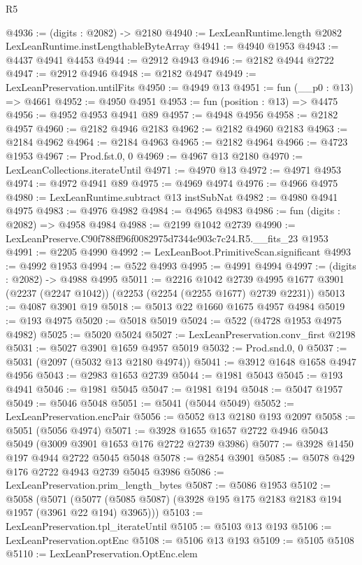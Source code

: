 \begin{lexlean}{R5}
\begin{coremodule}
@4936 := (digits : @2082) -> @2180
@4940 := LexLeanRuntime.length @2082 LexLeanRuntime.instLengthableByteArray
@4941 := @4940 @1953
@4943 := @4437 @4941 @4453
@4944 := @2912 @4943
@4946 := @2182 @4944 @2722
@4947 := @2912 @4946
@4948 := @2182 @4947
@4949 := LexLeanPreservation.untilFits
@4950 := @4949 @13
@4951 := fun (__p0 : @13) => @4661
@4952 := @4950 @4951
@4953 := fun (position : @13) => @4475
@4956 := @4952 @4953 @4941 @89
@4957 := @4948 @4956
@4958 := @2182 @4957
@4960 := @2182 @4946 @2183
@4962 := @2182 @4960 @2183
@4963 := @2184 @4962
@4964 := @2184 @4963
@4965 := @2182 @4964
@4966 := @4723 @1953
@4967 := Prod.fst.{0, 0}
@4969 := @4967 @13 @2180
@4970 := LexLeanCollections.iterateUntil
@4971 := @4970 @13
@4972 := @4971 @4953
@4974 := @4972 @4941 @89
@4975 := @4969 @4974
@4976 := @4966 @4975
@4980 := LexLeanRuntime.subtract @13 instSubNat
@4982 := @4980 @4941 @4975
@4983 := @4976 @4982
@4984 := @4965 @4983
@4986 := fun (digits : @2082) => @4958 @4984
@4988 := @2199 @1042 @2739
@4990 := LexLeanPreserve.C90f788ff96f0082975d7344e903c7c24.R5.__fits_23 @1953
@4991 := @2205 @4990
@4992 := LexLeanBoot.PrimitiveScan.significant
@4993 := @4992 @1953
@4994 := @522 @4993
@4995 := @4991 @4994
@4997 := (digits : @2082) -> @4988 @4995
@5011 := @2216
    @1042
    @2739
    @4995
    @1677
    @3901
    (@2237 (@2247 @1042))
    (@2253 (@2254 (@2255 @1677) @2739 @2231))
@5013 := @4087 @3901 @19
@5018 := @5013 @22 @1660 @1675 @4957 @4984
@5019 := @193 @4975
@5020 := @5018 @5019
@5024 := @522 (@4728 @1953 @4975 @4982)
@5025 := @5020 @5024
@5027 := LexLeanPreservation.conv_first @2198
@5031 := @5027 @3901 @1659 @4957 @5019
@5032 := Prod.snd.{0, 0}
@5037 := @5031 (@2097 (@5032 @13 @2180 @4974))
@5041 := @3912 @1648 @1658 @4947 @4956
@5043 := @2983 @1653 @2739
@5044 := @1981 @5043
@5045 := @193 @4941
@5046 := @1981 @5045
@5047 := @1981 @194
@5048 := @5047 @1957
@5049 := @5046 @5048
@5051 := @5041 (@5044 @5049)
@5052 := LexLeanPreservation.encPair
@5056 := @5052 @13 @2180 @193 @2097
@5058 := @5051 (@5056 @4974)
@5071 := @3928 @1655 @1657 @2722 @4946 @5043 @5049 (@3009 @3901 @1653 @176 @2722 @2739 @3986)
@5077 := @3928 @1450 @197 @4944 @2722 @5045 @5048
@5078 := @2854 @3901
@5085 := @5078 @429 @176 @2722 @4943 @2739 @5045 @3986
@5086 := LexLeanPreservation.prim_length_bytes
@5087 := @5086 @1953
@5102 := @5058
    (@5071 (@5077 (@5085 @5087) (@3928 @195 @175 @2183 @2183 @194 @1957 (@3961 @22 @194) @3965)))
@5103 := LexLeanPreservation.tpl_iterateUntil
@5105 := @5103 @13 @193
@5106 := LexLeanPreservation.optEnc
@5108 := @5106 @13 @193
@5109 := @5105 @5108
@5110 := LexLeanPreservation.OptEnc.elem

\end{coremodule}
\end{lexlean}
